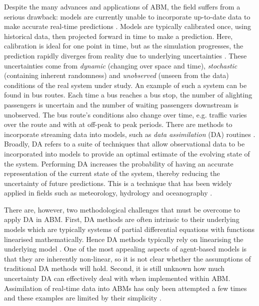 \documentclass{article}
\begin{document}
Despite the many advances and applications of ABM, the field suffers from a serious drawback: models are currently  unable to incorporate up-to-date data to make accurate real-time predictions \citep{lloyd_exploring_2016, wang_data_2015,
ward_dynamic_2016}. Models are typically calibrated once, using historical data, then projected forward in time to make a prediction. Here, calibration is ideal for one point in time, but as the simulation progresses, the prediction rapidly diverges from reality  due to underlying uncertainties \citep{ward_dynamic_2016}. These uncertainties come from \textit{dynamic} (changing over space and time), \textit{stochastic} (containing inherent randomness) and \textit{unobserved} (unseen from the data) conditions of the real system under study. An example of such a system can be found in bus routes. Each time a bus reaches a bus stop, the number of alighting passengers is uncertain and the number of waiting passengers downstream is unobserved. The bus route's conditions also change over time, e.g. traffic varies over the route and with at off-peak to peak periods. 
There are methods to incorporate streaming data into models,
such as \textit{data assimilation} (DA) routines
\citep{lewis_dynamic_2006, wang2000data}. Broadly, DA refers to a suite of techniques that allow
observational data to be incorporated into models
\citep{wang2000data} to provide an optimal estimate of the
evolving state of the system. Performing DA increases the
probability of having an accurate representation of the current state of
the system, thereby reducing the uncertainty of future predictions. This is a technique that has been widely applied
in fields such as meteorology, hydrology and oceanography \citep{kalnay_atmospheric_2003}.

There are, however, two methodological challenges that must be overcome to apply DA in ABM. First, DA methods are often intrinsic to their underlying models which are typically systems of partial differential equations with functions linearised mathematically.  Hence DA methods typically rely on linearising the underlying model \citep{harvey1990forecasting}. One of the most appealing aspects of agent-based models is that they are inherently non-linear, so it is not clear whether the assumptions of traditional DA methods will hold. Second, it is still unknown how much uncertainty DA can effectively deal with when implemented within ABM. Assimilation of real-time data into ABMs has only been attempted a few times and these examples are limited by their simplicity \citep{lloyd_exploring_2016, wang_data_2015,
ward_dynamic_2016}.
\end{document}
